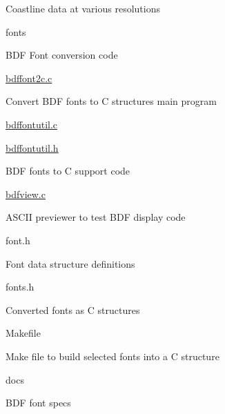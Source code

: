 \begin{DoxyItemize}
\begin{DoxyItemize}
\begin{DoxyItemize}
\begin{DoxyItemize}
\begin{DoxyItemize}
\begin{DoxyItemize}
\item Coastline data at various resolutions
\end{DoxyItemize}
\end{DoxyItemize}
\end{DoxyItemize}
\end{DoxyItemize}
\end{DoxyItemize}
\item fonts
\begin{DoxyItemize}
\item B\-D\-F Font conversion code
\begin{DoxyItemize}
\item \hyperlink{bdffont2c_8c}{bdffont2c.\-c}
\begin{DoxyItemize}
\item Convert B\-D\-F fonts to C structures main program
\end{DoxyItemize}
\item \hyperlink{bdffontutil_8c}{bdffontutil.\-c}
\item \hyperlink{bdffontutil_8h}{bdffontutil.\-h}
\begin{DoxyItemize}
\item B\-D\-F fonts to C support code
\end{DoxyItemize}
\item \hyperlink{bdfview_8c}{bdfview.\-c}
\begin{DoxyItemize}
\item A\-S\-C\-I\-I previewer to test B\-D\-F display code
\end{DoxyItemize}
\item font.\-h
\begin{DoxyItemize}
\item Font data structure definitions
\end{DoxyItemize}
\item fonts.\-h
\begin{DoxyItemize}
\item Converted fonts as C structures
\end{DoxyItemize}
\item Makefile
\begin{DoxyItemize}
\item Make file to build selected fonts into a C structure
\end{DoxyItemize}
\item docs
\begin{DoxyItemize}
\item B\-D\-F font specs
\end{DoxyItemize}

\end{DoxyItemize}
\end{DoxyItemize}
\end{DoxyItemize}
